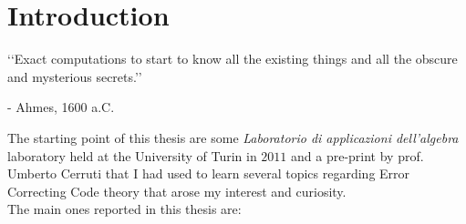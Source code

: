 

\chapter*{Introduction}

\begin{flushright}
\lq\lq Exact computations to start to know all the existing things and all the obscure and mysterious secrets.\rq\rq 
\vspace*{0.3cm}

- Ahmes, 1600 a.C.
\end{flushright}

\vspace*{0.6cm}

The starting point of this thesis are some \emph{Laboratorio di applicazioni dell'algebra} laboratory held at the University of Turin in $2011$ and a pre-print by prof. Umberto Cerruti \cite{cerruti} that I had used to learn several topics regarding Error Correcting Code theory that arose my interest and curiosity.\\
The main ones reported in this thesis are:
